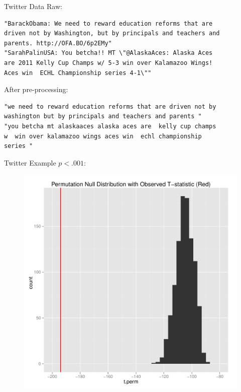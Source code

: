 \documentclass{beamer}
\begin{document}
\begin{frame}[fragile]{Twitter Data}
  Raw:
\begin{verbatim}
"BarackObama: We need to reward education reforms that are
driven not by Washington, but by principals and teachers and
parents. http://OFA.BO/6p2EMy"
"SarahPalinUSA: You betcha!! MT \"@AlaskaAces: Alaska Aces
are 2011 Kelly Cup Champs w/ 5-3 win over Kalamazoo Wings!
Aces win  ECHL Championship series 4-1\""
\end{verbatim}
  After pre-processing:
\begin{verbatim}
"we need to reward education reforms that are driven not by
washington but by principals and teachers and parents "
"you betcha mt alaskaaces alaska aces are  kelly cup champs
w  win over kalamazoo wings aces win  echl championship
series "
\end{verbatim}
\end{frame}

\begin{frame}{Twitter Example}
  $p < .001$:
    \begin{figure}[!ht]
   \centering
   \includegraphics[scale=.4]{pres6.pdf}
 \end{figure}
\end{frame}
\end{document}
